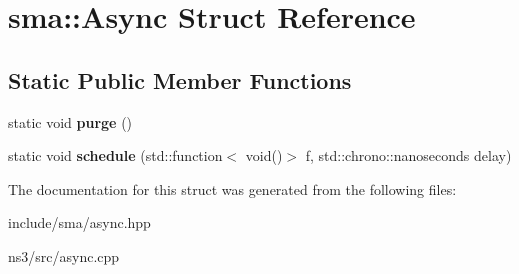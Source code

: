 \hypertarget{structsma_1_1Async}{\section{sma\-:\-:Async Struct Reference}
\label{structsma_1_1Async}
}
\subsection*{Static Public Member Functions}
\begin{DoxyCompactItemize}
\item 
\hypertarget{structsma_1_1Async_a88e8ad75e75506162a0197cf51cebc4e}{static void {\bfseries purge} ()}\label{structsma_1_1Async_a88e8ad75e75506162a0197cf51cebc4e}

\item 
\hypertarget{structsma_1_1Async_a1200e37ea6b493a8019ac73d9072ef20}{static void {\bfseries schedule} (std\-::function$<$ void()$>$ f, std\-::chrono\-::nanoseconds delay)}\label{structsma_1_1Async_a1200e37ea6b493a8019ac73d9072ef20}

\end{DoxyCompactItemize}


The documentation for this struct was generated from the following files\-:\begin{DoxyCompactItemize}
\item 
include/sma/async.\-hpp\item 
ns3/src/async.\-cpp\end{DoxyCompactItemize}
